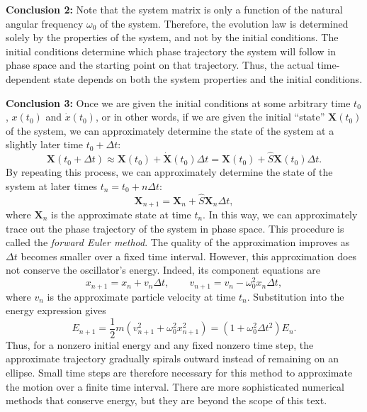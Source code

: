 \documentclass[12pt]{article}
\begin{document}
\textbf{Conclusion 2:} Note that the system matrix is only a function of the natural angular frequency $\omega_0$ of the system. Therefore, the evolution law is determined solely by the properties of the system, and not by the initial conditions. The initial conditions determine which phase trajectory the system will follow in phase space and the starting point on that trajectory. Thus, the actual time-dependent state depends on both the system properties and the initial conditions.

\textbf{Conclusion 3:} Once we are given the initial conditions at some arbitrary time $t_0$, $x(t_0)$ and $\dot{x}(t_0)$, or in other words, if we are given the initial ``state'' $\mathbf{X}(t_0)$ of the system, we can approximately determine the state of the system at a slightly later time $t_0+\Delta t$:
\begin{equation}
    \mathbf{X}(t_0+\Delta t)
    \approx \mathbf{X}(t_0)+\dot{\mathbf{X}}(t_0)\Delta t
    =\mathbf{X}(t_0)+\hat{S}\mathbf{X}(t_0)\Delta t.
\end{equation}
By repeating this process, we can approximately determine the state of the system at later times $t_n=t_0+n\Delta t$:
\begin{equation}
    \mathbf{X}_{n+1}
    =\mathbf{X}_n+\hat{S}\mathbf{X}_n\Delta t,
\end{equation}
where $\mathbf{X}_n$ is the approximate state at time $t_n$. In this way, we can approximately trace out the phase trajectory of the system in phase space. This procedure is called the \emph{forward Euler method}. The quality of the approximation improves as $\Delta t$ becomes smaller over a fixed time interval. However, this approximation does not conserve the oscillator's energy. Indeed, its component equations are
\begin{equation}
    x_{n+1}=x_n+v_n\Delta t,
    \qquad
    v_{n+1}=v_n-\omega_0^2x_n\Delta t,
\end{equation}
where $v_n$ is the approximate particle velocity at time $t_n$. Substitution into the energy expression gives
\begin{equation}
    E_{n+1}
    =\frac{1}{2}m\left(v_{n+1}^2+\omega_0^2x_{n+1}^2\right)
    =\left(1+\omega_0^2\Delta t^2\right)E_n.
\end{equation}
Thus, for a nonzero initial energy and any fixed nonzero time step, the approximate trajectory gradually spirals outward instead of remaining on an ellipse. Small time steps are therefore necessary for this method to approximate the motion over a finite time interval. There are more sophisticated numerical methods that conserve energy, but they are beyond the scope of this text.
\end{document}
